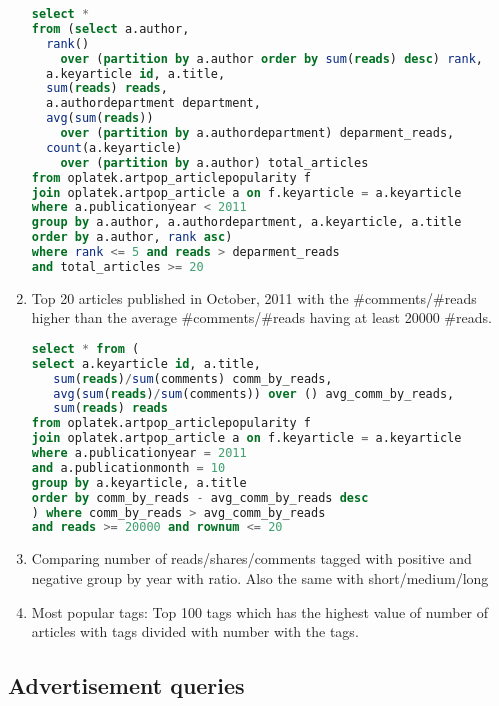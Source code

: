 \begin{enumerate}
\begin{lstlisting}[language=sql] 
select *
from (select a.author, 
  rank() 
    over (partition by a.author order by sum(reads) desc) rank,
  a.keyarticle id, a.title,
  sum(reads) reads, 
  a.authordepartment department,
  avg(sum(reads)) 
    over (partition by a.authordepartment) deparment_reads,
  count(a.keyarticle) 
    over (partition by a.author) total_articles
from oplatek.artpop_articlepopularity f
join oplatek.artpop_article a on f.keyarticle = a.keyarticle
where a.publicationyear < 2011
group by a.author, a.authordepartment, a.keyarticle, a.title
order by a.author, rank asc)
where rank <= 5 and reads > deparment_reads 
and total_articles >= 20
\end{lstlisting}
\item    Top 20 articles published in October, 2011 with the \#comments/\#reads higher than the average \#comments/\#reads having at least 20000 \#reads.
\begin{lstlisting}[language=sql] 
select * from (
select a.keyarticle id, a.title,
   sum(reads)/sum(comments) comm_by_reads,
   avg(sum(reads)/sum(comments)) over () avg_comm_by_reads,
   sum(reads) reads
from oplatek.artpop_articlepopularity f
join oplatek.artpop_article a on f.keyarticle = a.keyarticle
where a.publicationyear = 2011 
and a.publicationmonth = 10
group by a.keyarticle, a.title
order by comm_by_reads - avg_comm_by_reads desc
) where comm_by_reads > avg_comm_by_reads 
and reads >= 20000 and rownum <= 20
\end{lstlisting}
\item    Comparing number of reads/shares/comments tagged with positive and negative group by year with ratio. Also the same with short/medium/long
\item    Most popular tags:  Top 100 tags which has the highest value of number of articles with tags divided with number with the tags.
\end{enumerate}

\subsection*{Advertisement  queries} %
\label{sub:Advertisement queries}

